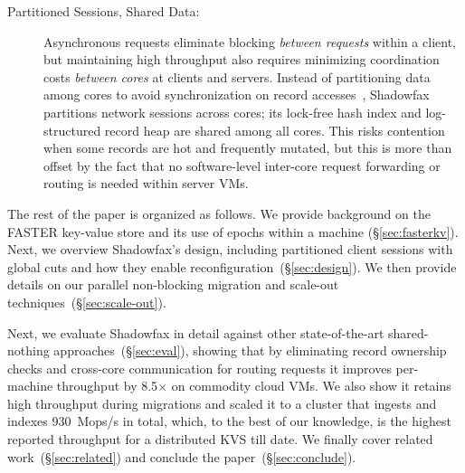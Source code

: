 \begin{description}
\item[Partitioned Sessions, Shared Data:]
Asynchronous requests eliminate blocking {\em between requests} within a client, but
maintaining high throughput also requires minimizing coordination
costs {\em between cores} at clients and servers.
%
Instead of partitioning data among cores to avoid synchronization on record
accesses~\cite{hstore,voltdb,mica,seastar}, Shadowfax partitions network
sessions across cores; its lock-free hash index and log-structured record heap
are shared among all cores.
%
This risks contention when some records are hot and frequently
mutated, but this is more than offset by the fact that no software-level
inter-core request forwarding or routing is needed within server VMs.

\end{description}

The rest of the paper is organized as follows. We provide background on the FASTER
key-value store and its use of epochs within a machine (\S\ref{sec:fasterkv}). Next,
we overview Shadowfax's design, including partitioned client
sessions with global cuts and how they enable
reconfiguration~(\S\ref{sec:design}). We then provide details on our parallel
non-blocking migration and scale-out techniques~(\S\ref{sec:scale-out}).
%
\iffalse
In the remainder of this paper, we describe how the key synchronization
mechanisms at the core of \faster{}'s design (\S\ref{sec:epochs}) naturally led
to Shadowfax's sessions that extend global cuts over the network
(\S\ref{sec:sessions}). We describe how this enables Shadowfax to perform the
same over the network as with a local \faster{}
instance~(\S\ref{sec:eval:clients}), and we describe how they enable
reconfiguration~(\S\ref{sec:ownership}) and parallel data
migration~(\S\ref{sec:scale-out}). We also describe how Shadowfax does this
while supporting larger-than-memory datasets that span SSD and cloud blob
storage.
\fi
%
Next, we evaluate Shadowfax in detail against other state-of-the-art shared-nothing
approaches~(\S\ref{sec:eval}), showing that by eliminating record ownership
checks and cross-core communication for routing requests it improves
per-machine throughput by 8.5$\times$ on commodity cloud VMs.
%
We also show it retains high throughput during migrations and scaled it
to a
cluster that ingests and indexes 930~Mops/s in total,
%
which, to the best of our knowledge, is the highest
reported throughput for a distributed KVS till date. We finally cover
related work~(\S\ref{sec:related}) and conclude the paper~(\S\ref{sec:conclude}).
